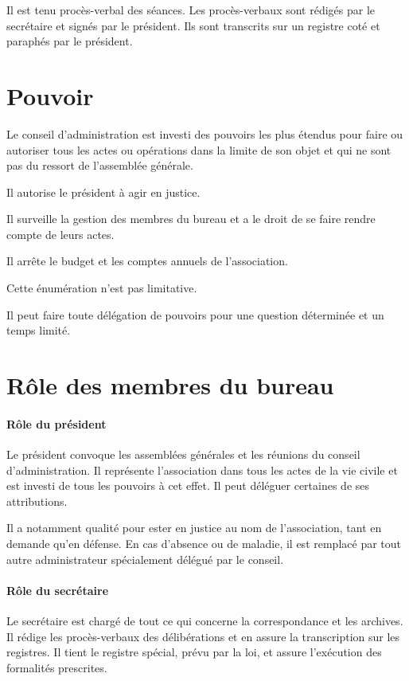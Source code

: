 \documentclass{article}
\begin{document}
Il est tenu procès-verbal des séances. Les procès-verbaux sont rédigés
par le secrétaire et signés par le président. Ils sont transcrits sur
un registre coté et paraphés par le président.

\section{Pouvoir}
\label{sec:pouvoir}

Le conseil d'administration est investi des pouvoirs les plus étendus
pour faire ou autoriser tous les actes ou opérations dans la limite de
son objet et qui ne sont pas du ressort de l'assemblée générale.

Il autorise le président à agir en justice.

Il surveille la gestion des membres du bureau et a le droit de se
faire rendre compte de leurs actes.

Il arrête le budget et les comptes annuels de l'association.

Cette énumération n'est pas limitative.

Il peut faire toute délégation de pouvoirs pour une question
déterminée et un temps limité.

\section{Rôle des membres du bureau}
\label{sec:role-des-membres-du-bureau}

\paragraph{Rôle du président}

Le président convoque les assemblées générales et les réunions du
conseil d'administration. Il représente l'association dans tous les
actes de la vie civile et est investi de tous les pouvoirs à cet
effet. Il peut déléguer certaines de ses attributions.

Il a notamment qualité pour ester en justice au nom de l'association,
tant en demande qu'en défense. En cas d'absence ou de maladie, il est
remplacé par tout autre administrateur spécialement délégué par le
conseil.

\paragraph{Rôle du secrétaire}

Le secrétaire est chargé de tout ce qui concerne la correspondance et
les archives.  Il rédige les procès-verbaux des délibérations et en
assure la transcription sur les registres.  Il tient le registre
spécial, prévu par la loi, et assure l'exécution des formalités
prescrites.
\end{document}
